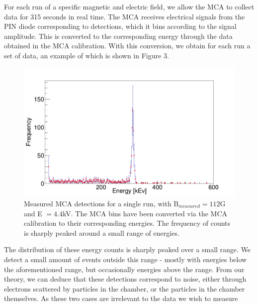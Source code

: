 For each run of a specific magnetic and electric field, we allow the MCA to collect data for 315 seconds in real time. The MCA receives electrical signals from the PIN diode corresponding to detections, which it bins according to the signal amplitude. This is converted to the corresponding energy through the data obtained in the MCA calibration. With this conversion, we obtain for each run a set of data, an example of which is shown in Figure 3. 

\begin{figure}[h]
  \includegraphics[width=.5\textwidth]{mca-readout.png}
  \caption{Measured MCA detections for a single run, with $\text{B}_{measured} = 112$G and E $ = 4.4$kV. The MCA bins have been converted via the MCA calibration to their corresponding energies. The frequency of counts is sharply peaked around a small range of energies.}
  \end{figure}
      
The distribution of these energy counts is sharply peaked over a small range. We detect a small amount of events outside this range - mostly with energies below the aforementioned range, but occasionally energies above the range. From our theory, we can deduce that these detections correspond to noise, either through electrons scattered by particles in the chamber, or the particles in the chamber themselves. As these two cases are irrelevant to the data we wish to measure

\clearpage
\appendix
